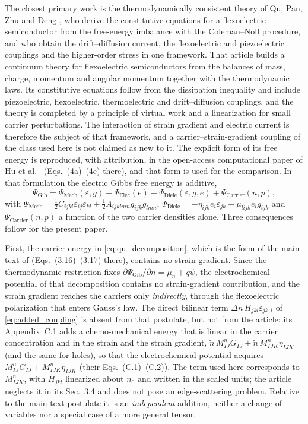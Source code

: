 The closest primary work is the thermodynamically consistent theory of Qu, Pan,
Zhu and Deng \cite{qu2025thermodynamic}, who derive the constitutive equations
for a flexoelectric semiconductor from the free-energy imbalance with the
Coleman--Noll procedure, and who obtain the drift--diffusion current, the
flexoelectric and piezoelectric couplings and the higher-order stress in one
framework.  That article builds a continuum theory for flexoelectric semiconductors from
the balances of mass, charge, momentum and angular momentum together with the
thermodynamic laws.  Its constitutive equations follow from the dissipation
inequality and include piezoelectric, flexoelectric, thermoelectric and
drift--diffusion couplings, and the theory is completed by a principle of virtual
work and a linearization for small carrier perturbations.  The interaction of
strain gradient and electric current is therefore the subject of that framework,
and a carrier--strain-gradient coupling of the class used here is not claimed as
new to it.  The explicit form of its free energy is reproduced, with attribution,
in the open-access computational paper of Hu et al.\ \cite{hu2025computational}
(Eqs.~(4a)--(4e) there), and that form is used for the comparison.  In
that formulation the electric Gibbs free energy is additive,
\begin{equation}
\Psi_{\text{Gib}}=\Psi_{\text{Mech}}(\varepsilon,g)
+\Psi_{\text{Elec}}(e)+\Psi_{\text{Diele}}(\varepsilon,g,e)
+\Psi_{\text{Carrier}}(n,p),
\label{eq:qu_decomposition}
\end{equation}
with
$\Psi_{\text{Mech}}=\tfrac12C_{ijkl}\varepsilon_{ij}\varepsilon_{kl}
+\tfrac12A_{ijklmn}g_{ijk}g_{lmn}$,
$\Psi_{\text{Diele}}=-\eta_{ijk}e_i\varepsilon_{jk}
-\mu_{lijk}e_l g_{ijk}$ and
$\Psi_{\text{Carrier}}(n,p)$ a function of the two carrier densities alone.
Three consequences follow for the present paper.

First, the carrier energy in \eqref{eq:qu_decomposition}, which is the form of the main text of \cite{qu2025thermodynamic} (Eqs.~(3.16)--(3.17) there), contains no strain
gradient.  Since the thermodynamic restriction fixes
$\partial\Psi_{\text{Gib}}/\partial n=\mu_n+q\psi$, the electrochemical potential
of that decomposition contains no strain-gradient contribution, and the strain
gradient reaches the carriers only \emph{indirectly}, through the flexoelectric
polarization that enters Gauss's law.  The direct bilinear term
$\Delta n\,H_{jkl}\varepsilon_{jk,l}$ of \eqref{eq:added_coupling} is absent from
that postulate, but not from the article: its Appendix~C.1 adds a chemo-mechanical
energy that is linear in the carrier concentration and in the strain and the strain gradient,
$\tilde n\,M^{n}_{IJ}G_{IJ}+\tilde n\,M^{n}_{IJK}\eta_{IJK}$ (and the same for holes), so that the
electrochemical potential acquires $M^{n}_{IJ}G_{IJ}+M^{n}_{IJK}\eta_{IJK}$ (their Eqs.~(C.1)--(C.2)).  The term used here
corresponds to $M^{n}_{IJK}$, with $H_{jkl}$ linearized about $n_0$ and written in the scaled units; the article neglects it in its Sec.~3.4 and does not pose an edge-scattering problem.
Relative to the main-text postulate it is an \emph{independent} addition, neither a
change of variables nor a special case of a more general tensor.

